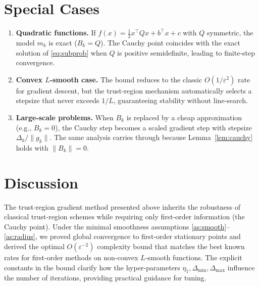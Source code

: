 \documentclass[11pt]{article}
\begin{document}
\section*{Special Cases}
\begin{enumerate}[noitemsep]
\item \textbf{Quadratic functions.} If $f(x)=\tfrac12 x^{\top}Qx+b^{\top}x+c$ with $Q$ symmetric, the model $m_{k}$ is exact ($B_{k}=Q$). The Cauchy point coincides with the exact solution of \eqref{eq:subprob} when $Q$ is positive semidefinite, leading to finite‑step convergence.
\item \textbf{Convex $L$‑smooth case.} The bound reduces to the classic $O(1/\varepsilon^{2})$ rate for gradient descent, but the trust‑region mechanism automatically selects a stepsize that never exceeds $1/L$, guaranteeing stability without line‑search.
\item \textbf{Large‑scale problems.} When $B_{k}$ is replaced by a cheap approximation (e.g., $B_{k}=0$), the Cauchy step becomes a scaled gradient step with stepsize $\Delta_{k}/\|g_{k}\|$. The same analysis carries through because Lemma~\ref{lem:cauchy} holds with $\|B_{k}\|=0$.
\end{enumerate}

\section*{Discussion}
The trust‑region gradient method presented above inherits the robustness of classical trust‑region schemes while requiring only first‑order information (the Cauchy point). Under the minimal smoothness assumptions \ref{as:smooth}–\ref{as:radius}, we proved global convergence to first‑order stationary points and derived the optimal $O(\varepsilon^{-2})$ complexity bound that matches the best known rates for first‑order methods on non‑convex $L$‑smooth functions. The explicit constants in the bound clarify how the hyper‑parameters $\eta_{1},\Delta_{\min},\Delta_{\max}$ influence the number of iterations, providing practical guidance for tuning.
\end{document}
